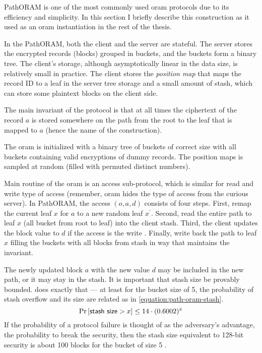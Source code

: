 			PathORAM \cite{path-oram} is one of the most commonly used \acrshort{oram} protocols due to its efficiency and simplicity.
			In this section I briefly describe this construction as it used as an \acrshort{oram} instantiation in the rest of the thesis.

			In the PathORAM, both the client \client{} and the server \server{} are stateful.
			The server stores the encrypted records (blocks) grouped in buckets, and the buckets form a binary tree.
			The client's storage, although asymptotically linear in the data size, is relatively small in practice.
			The client stores the \emph{position map} that maps the record ID to a leaf in the server tree storage and a small amount of stash, which can store some plaintext blocks on the client side.

			The main invariant of the protocol is that at all times the ciphertext of the record $a$ is stored somewhere on the path from the root to the leaf that is mapped to $a$ (hence the name of the construction).

			The \acrshort{oram} is initialized with a binary tree of buckets of correct size with all buckets containing valid encryptions of dummy records.
			The position maps is sampled at random (filled with permuted distinct numbers).

			Main routine of the \acrshort{oram} is an access sub-protocol, which is similar for read \oramRead{} and write \oramWrite{} type of access (remember, \acrshort{oram} hides the type of access from the curious server).
			In PathORAM, the access $(o, a, d)$ consists of four steps.
			First, remap the current leaf $x$ for $a$ to a new random leaf $x^\prime$.
			Second, read the entire path to leaf $x$ (all bucket from root to leaf) into the client stash.
			Third, the client updates the block value to $d$ if the access is the write \oramWrite{}.
			Finally, write back the path to leaf $x$ filling the buckets with all blocks from stash in way that maintains the invariant.

			The newly updated block $a$ with the new value $d$ may be included in the new path, or it may stay in the stash.
			It is important that stash size be provably bounded.
			\cite[Theorem 1]{path-oram} does exactly that --- at least for the bucket size of 5, the probability of stash overflow and its size are related as in \cref{equation:path-oram-stash}.
			\begin{equation}\label{equation:path-oram-stash}
				\probability{ \mathsf{stash\ size} > x } \leq 14 \cdot (0.6002) ^ x
			\end{equation}
			If the probability of a protocol failure is thought of as the adversary's advantage, the probability to break the security, then the stash size equivalent to 128-bit security is about 100 blocks for the bucket of size 5 \cite[Figure 5]{path-oram}.

